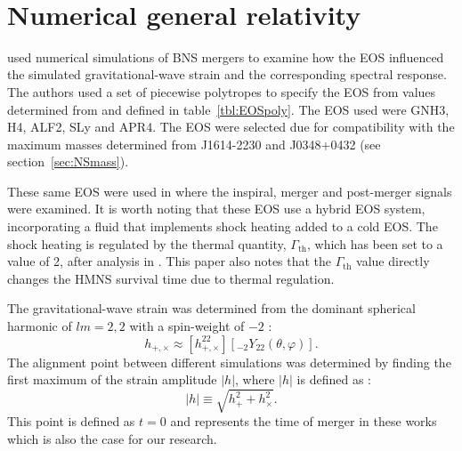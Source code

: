 
\
\section{Numerical general relativity}
	\label{sec:NR}
	\cite{Takami2015} used numerical simulations of BNS mergers to examine how the EOS influenced the simulated gravitational-wave strain and the corresponding spectral response. The authors used a set of piecewise polytropes to specify the EOS from values determined from \cite{Read2009} and defined in table~\ref{tbl:EOSpoly}. The EOS used were GNH3, H4, ALF2, SLy and APR4. The EOS were selected due for compatibility with the  maximum masses determined from J1614-2230 and J0348+0432 (see section~\ref{sec:NSmass}).
	
	These same EOS were used in \cite{Rezzolla2016} where the inspiral, merger and post-merger signals were examined. It is worth noting that these EOS use a hybrid EOS system, incorporating a fluid that implements shock heating added to a cold EOS. The shock heating is regulated by the thermal quantity, $\Gamma_{\mathrm{th}}$, which has been set to a value of 2, after analysis in \cite{Takami2015}. This paper also notes that the $\Gamma_{\mathrm{th}}$ value directly changes the HMNS survival time due to thermal regulation. \par
	The gravitational-wave strain was determined from the dominant spherical harmonic of $lm=2,2$ with a spin-weight of $-2$ \citep{Rezzolla2016}:
\begin{equation}
	h_{+,\times} \approx \left[h_{+,\times}^{22}\right] \left[ _{-2}Y_{22}(\theta,\varphi)\right].
	\label{eq:hSpherical}
\end{equation}
	The alignment point between different simulations was determined by finding the first maximum of the strain amplitude $|h|$, where $|h|$ is defined as \citep{Rezzolla2016}:
\begin{equation}
	\left| h \right| \equiv \sqrt{h_+^2+h_\times^2}.
	\label{eq:hmag}
\end{equation}
	This point is defined as $t=0$ and represents the time of merger in these works which is also the case for our research.


